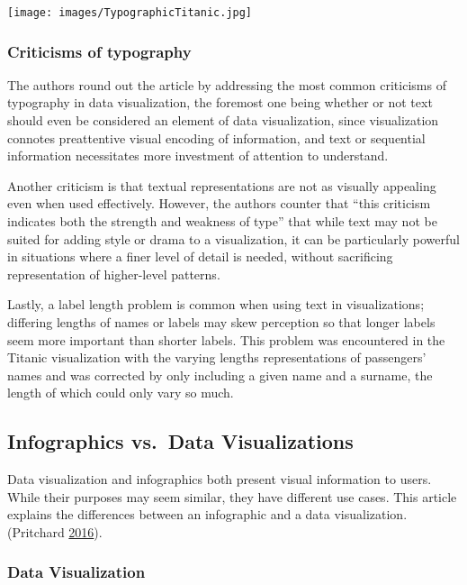 \documentclass[]{book}
\begin{document}
\texttt{[image: images/TypographicTitanic.jpg]}

\hypertarget{criticisms-of-typography}{%
\subsubsection{Criticisms of typography}\label{criticisms-of-typography}}

The authors round out the article by addressing the most common criticisms of typography in data visualization, the foremost one being whether or not text should even be considered an element of data visualization, since visualization connotes preattentive visual encoding of information, and text or sequential information necessitates more investment of attention to understand.

Another criticism is that textual representations are not as visually appealing even when used effectively. However, the authors counter that ``this criticism indicates both the strength and weakness of type'' that while text may not be suited for adding style or drama to a visualization, it can be particularly powerful in situations where a finer level of detail is needed, without sacrificing representation of higher-level patterns.

Lastly, a label length problem is common when using text in visualizations; differing lengths of names or labels may skew perception so that longer labels seem more important than shorter labels. This problem was encountered in the Titanic visualization with the varying lengths representations of passengers' names and was corrected by only including a given name and a surname, the length of which could only vary so much.

\hypertarget{infographics-vs.data-visualizations}{%
\subsection{Infographics vs.~Data Visualizations}\label{infographics-vs.data-visualizations}}

Data visualization and infographics both present visual information to users. While their purposes may seem similar, they have different use cases. This article explains the differences between an infographic and a data visualization. (Pritchard \protect\hyperlink{ref-VIZVSINFO}{2016}).

\hypertarget{data-visualization}{%
\subsubsection{Data Visualization}\label{data-visualization}}
\end{document}
